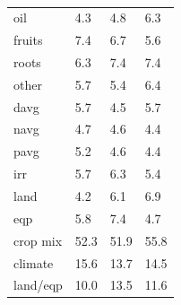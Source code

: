 \documentclass[11pt]{article}
\begin{document}
\begin{table}
{\begin{tabular}{llll}
oil & 4.3 & 4.8 & 6.3 \\
fruits & 7.4 & 6.7 & 5.6 \\
roots & 6.3 & 7.4 & 7.4 \\
other & 5.7 & 5.4 & 6.4 \\
davg & 5.7 & 4.5 & 5.7 \\
navg & 4.7 & 4.6 & 4.4 \\
pavg & 5.2 & 4.6 & 4.4 \\
irr & 5.7 & 6.3 & 5.4 \\
land & 4.2 & 6.1 & 6.9 \\
eqp & 5.8 & 7.4 & 4.7 \\
\midrule
crop mix & 52.3 & 51.9 & 55.8 \\
climate & 15.6 & 13.7 & 14.5 \\
land/eqp & 10.0 & 13.5 & 11.6 \\
\bottomrule
\end{tabular}
\caption{ }
\label{t.ny.temp_percentages}
}
\end{table}
\end{document}
